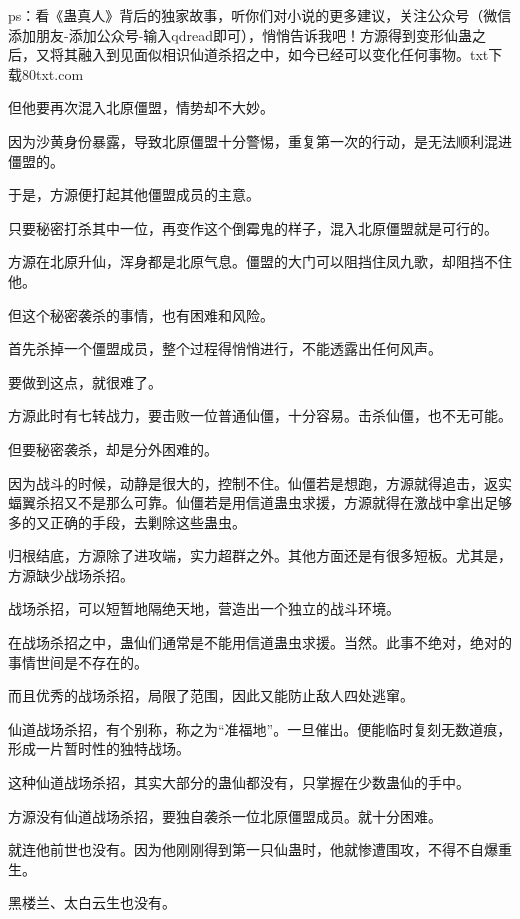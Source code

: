 
\begin{this_body}

ps：看《蛊真人》背后的独家故事，听你们对小说的更多建议，关注公众号（微信添加朋友-添加公众号-输入qdread即可），悄悄告诉我吧！方源得到变形仙蛊之后，又将其融入到见面似相识仙道杀招之中，如今已经可以变化任何事物。txt下载80txt.com

但他要再次混入北原僵盟，情势却不大妙。

因为沙黄身份暴露，导致北原僵盟十分警惕，重复第一次的行动，是无法顺利混进僵盟的。

于是，方源便打起其他僵盟成员的主意。

只要秘密打杀其中一位，再变作这个倒霉鬼的样子，混入北原僵盟就是可行的。

方源在北原升仙，浑身都是北原气息。僵盟的大门可以阻挡住凤九歌，却阻挡不住他。

但这个秘密袭杀的事情，也有困难和风险。

首先杀掉一个僵盟成员，整个过程得悄悄进行，不能透露出任何风声。

要做到这点，就很难了。

方源此时有七转战力，要击败一位普通仙僵，十分容易。击杀仙僵，也不无可能。

但要秘密袭杀，却是分外困难的。

因为战斗的时候，动静是很大的，控制不住。仙僵若是想跑，方源就得追击，返实蝠翼杀招又不是那么可靠。仙僵若是用信道蛊虫求援，方源就得在激战中拿出足够多的又正确的手段，去剿除这些蛊虫。

归根结底，方源除了进攻端，实力超群之外。其他方面还是有很多短板。尤其是，方源缺少战场杀招。

战场杀招，可以短暂地隔绝天地，营造出一个独立的战斗环境。

在战场杀招之中，蛊仙们通常是不能用信道蛊虫求援。当然。此事不绝对，绝对的事情世间是不存在的。

而且优秀的战场杀招，局限了范围，因此又能防止敌人四处逃窜。

仙道战场杀招，有个别称，称之为“准福地”。一旦催出。便能临时复刻无数道痕，形成一片暂时性的独特战场。

这种仙道战场杀招，其实大部分的蛊仙都没有，只掌握在少数蛊仙的手中。

方源没有仙道战场杀招，要独自袭杀一位北原僵盟成员。就十分困难。

就连他前世也没有。因为他刚刚得到第一只仙蛊时，他就惨遭围攻，不得不自爆重生。

黑楼兰、太白云生也没有。


\end{this_body}
